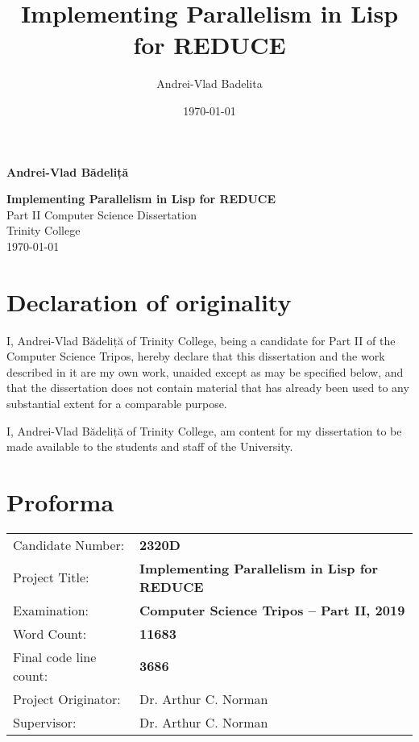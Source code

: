\documentclass[a4paper,12pt,twoside,openany]{report}
\date{\today}
\title{Implementing Parallelism in Lisp for REDUCE}
\author{Andrei-Vlad Badelita}
\begin{document}

\hfill{\LARGE \bf Andrei-Vlad Bădeliță}

\pagestyle{empty}

\vspace*{60mm}
\begin{center}
\Huge{\bf Implementing Parallelism in Lisp for REDUCE} \\
\vspace*{5mm}
Part II Computer Science Dissertation \\
\vspace*{5mm}
Trinity College \\
\vspace*{5mm}
\today  %
\end{center}

\cleardoublepage


\pagestyle{plain}

\section*{Declaration of originality}

I, Andrei-Vlad Bădeliță of Trinity College, being a candidate for Part II of the
Computer Science Tripos, hereby declare that this dissertation and the work described
in it are my own work, unaided except as may be specified below, and that the
dissertation does not contain material that has already been used to any
substantial extent for a comparable purpose.

\medskip
\noindent
I, Andrei-Vlad Bădeliță of Trinity College, am content for my dissertation
to be made available to the students and staff of the University.

\bigskip
{}

\medskip
{}

\newpage

\section*{Proforma}

{\large
\begin{tabular}{ll}
Candidate Number:   & \bf 2320D \\
Project Title:      & \bf Implementing Parallelism in Lisp for REDUCE \\
Examination:        & \bf Computer Science Tripos -- Part II, 2019  \\
Word Count:         & \bf 11683          \\
Final code line count: & \bf 3686        \\
Project Originator: & Dr. Arthur C. Norman                    \\
Supervisor:         & Dr. Arthur C. Norman                    \\
\end{tabular}
}
\end{document}

